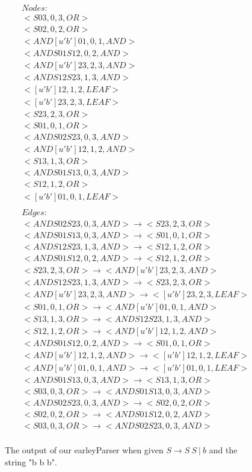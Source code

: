 \documentclass{sigplanconf}
\begin{document}
\begin{figure}
\begin{center}
\begin{align*}
&Nodes: \\
&<S03,0,3,OR> \\
&<S02,0,2,OR> \\
&<AND[u'b']01,0,1,AND> \\
&<ANDS01S12,0,2,AND> \\
&<AND[u'b']23,2,3,AND> \\
&<ANDS12S23,1,3,AND> \\
&<[u'b']12,1,2,LEAF> \\
&<[u'b']23,2,3,LEAF> \\
&<S23,2,3,OR> \\
&<S01,0,1,OR> \\
&<ANDS02S23,0,3,AND> \\
&<AND[u'b']12,1,2,AND> \\
&<S13,1,3,OR> \\
&<ANDS01S13,0,3,AND> \\
&<S12,1,2,OR> \\
&<[u'b']01,0,1,LEAF> \\
\\
&Edges: \\
&<ANDS02S23,0,3,AND>\longrightarrow<S23,2,3,OR> \\
&<ANDS01S13,0,3,AND>\longrightarrow<S01,0,1,OR> \\
&<ANDS12S23,1,3,AND>\longrightarrow<S12,1,2,OR> \\
&<ANDS01S12,0,2,AND>\longrightarrow<S12,1,2,OR> \\
&<S23,2,3,OR>\longrightarrow<AND[u'b']23,2,3,AND> \\
&<ANDS12S23,1,3,AND>\longrightarrow<S23,2,3,OR> \\
&<AND[u'b']23,2,3,AND>\longrightarrow<[u'b']23,2,3,LEAF> \\
&<S01,0,1,OR>\longrightarrow<AND[u'b']01,0,1,AND> \\
&<S13,1,3,OR>\longrightarrow<ANDS12S23,1,3,AND> \\
&<S12,1,2,OR>\longrightarrow<AND[u'b']12,1,2,AND> \\
&<ANDS01S12,0,2,AND>\longrightarrow<S01,0,1,OR> \\
&<AND[u'b']12,1,2,AND>\longrightarrow<[u'b']12,1,2,LEAF>  \\
&<AND[u'b']01,0,1,AND>\longrightarrow<[u'b']01,0,1,LEAF> \\
&<ANDS01S13,0,3,AND>\longrightarrow<S13,1,3,OR> \\
&<S03,0,3,OR>\longrightarrow<ANDS01S13,0,3,AND> \\
&<ANDS02S23,0,3,AND>\longrightarrow<S02,0,2,OR> \\
&<S02,0,2,OR>\longrightarrow<ANDS01S12,0,2,AND> \\
&<S03,0,3,OR>\longrightarrow<ANDS02S23,0,3,AND> \\
\end{align*}
\caption{The output of our earleyParser when given $S\longrightarrow{S\:{S\:{|\:{b}}}}$ and the string "b b b".} \label{fig:M6}
\end{center}
\end{figure}
\end{document}
